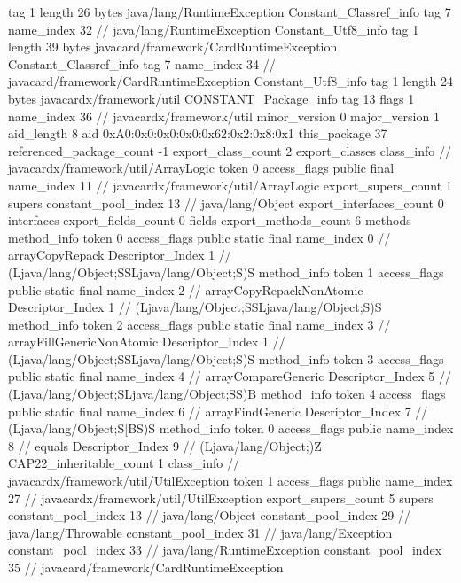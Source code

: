 {{{			tag	1
			length	26
			bytes	java/lang/RuntimeException
		}
		Constant_Classref_info {
			tag	7
			name_index	32		// java/lang/RuntimeException
		}
		Constant_Utf8_info {
			tag	1
			length	39
			bytes	javacard/framework/CardRuntimeException
		}
		Constant_Classref_info {
			tag	7
			name_index	34		// javacard/framework/CardRuntimeException
		}
		Constant_Utf8_info {
			tag	1
			length	24
			bytes	javacardx/framework/util
		}
		CONSTANT_Package_info {
			tag	13
			flags	1
			name_index	36		// javacardx/framework/util
			minor_version	0
			major_version	1
			aid_length	8
			aid	0xA0:0x0:0x0:0x0:0x62:0x2:0x8:0x1
		}
	}
	this_package	37
	referenced_package_count	-1
	export_class_count	2
	export_classes {
		class_info {		// javacardx/framework/util/ArrayLogic
			token	0
			access_flags	public final
			name_index	11		// javacardx/framework/util/ArrayLogic
			export_supers_count	1
			supers {
				constant_pool_index	13		// java/lang/Object
			}
			export_interfaces_count	0
			interfaces {
			}
			export_fields_count	0
			fields {
			}
			export_methods_count	6
			methods {
				method_info {
					token	0
					access_flags	public static final
					name_index	0		// arrayCopyRepack
					Descriptor_Index	1		// (Ljava/lang/Object;SSLjava/lang/Object;S)S
				}
				method_info {
					token	1
					access_flags	public static final
					name_index	2		// arrayCopyRepackNonAtomic
					Descriptor_Index	1		// (Ljava/lang/Object;SSLjava/lang/Object;S)S
				}
				method_info {
					token	2
					access_flags	public static final
					name_index	3		// arrayFillGenericNonAtomic
					Descriptor_Index	1		// (Ljava/lang/Object;SSLjava/lang/Object;S)S
				}
				method_info {
					token	3
					access_flags	public static final
					name_index	4		// arrayCompareGeneric
					Descriptor_Index	5		// (Ljava/lang/Object;SLjava/lang/Object;SS)B
				}
				method_info {
					token	4
					access_flags	public static final
					name_index	6		// arrayFindGeneric
					Descriptor_Index	7		// (Ljava/lang/Object;S[BS)S
				}
				method_info {
					token	0
					access_flags	public
					name_index	8		// equals
					Descriptor_Index	9		// (Ljava/lang/Object;)Z
				}
			}
			CAP22_inheritable_count	1
		}
		class_info {		// javacardx/framework/util/UtilException
			token	1
			access_flags	public
			name_index	27		// javacardx/framework/util/UtilException
			export_supers_count	5
			supers {
				constant_pool_index	13		// java/lang/Object
				constant_pool_index	29		// java/lang/Throwable
				constant_pool_index	31		// java/lang/Exception
				constant_pool_index	33		// java/lang/RuntimeException
				constant_pool_index	35		// javacard/framework/CardRuntimeException
}}}}
